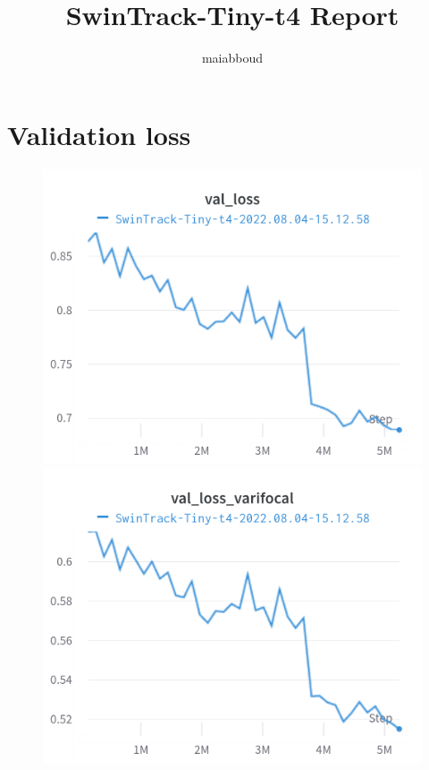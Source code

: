 \documentclass{article}
\title{SwinTrack-Tiny-t4 Report}
\author{%
maiabboud
}
\begin{document}
\maketitle

\section{Validation loss}

\begin{figure}[h]
\includegraphics[width=\linewidth]{charts/Section-2-Panel-0-jvrhhrv9d}
\caption{}
\endminipage\hfill
{}
\includegraphics[width=\linewidth]{charts/Section-2-Panel-1-5x2brafi7}
\caption{}
\endminipage
\end{figure}
\end{document}
